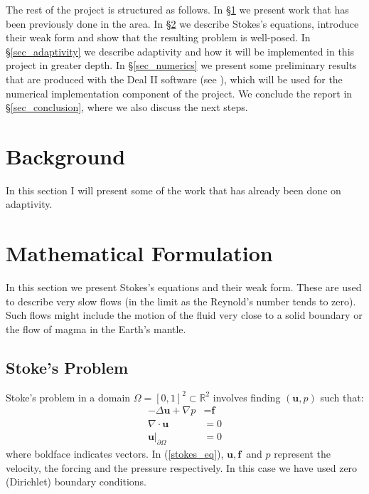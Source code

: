 \documentclass[12pt,a4paper]{article}
\theoremstyle{definition}
\begin{document}
The rest of the project is structured as follows.  In \S \ref{sec_back} we present work that has been previously done in the area.  In \S \ref{sec_mathform} we describe Stokes's equations, introduce their weak form and show that the resulting problem is well-posed.  In \S \ref{sec_adaptivity} we  describe adaptivity and how it will be implemented in this project in greater depth.  In \S \ref{sec_numerics} we present some preliminary results that are produced with the Deal II software (see \cite{BangerthHartmannKanschat2007}), which  will be used for the numerical implementation component of the project.  We conclude the report in \S \ref{sec_conclusion}, where we also discuss the next steps.

\section{Background}\label{sec_back}
In this section I will present some of the work that has already been done on adaptivity.

\section{Mathematical Formulation}\label{sec_mathform}
In this section we present Stokes's equations and their weak form.   These are used to describe very slow flows (in the limit as the Reynold's number tends to zero).  Such flows might include the motion of the fluid very close to a solid boundary or the flow of magma in the Earth's mantle.  
\subsection{Stoke's Problem}
Stoke's problem in a domain $\Omega = \left[0,1\right]^2 \subset \mathbb{R}^2$ involves finding $\left(\textbf{u},p\right)$ such that:
\begin{equation}\label{stokes_eq}
\begin{aligned}
	-\Delta\textbf{u} + \nabla p &= \textbf{f} \\ 
	\nabla\cdot \textbf{u}&= 0\\ 
\textbf{u}|_{\partial\Omega}&=0 
\end{aligned}
\end{equation}
where boldface indicates vectors.  In (\ref{stokes_eq}), $\textbf{u},\, \textbf{f}$ and $p$ represent the velocity, the forcing and the pressure respectively.  In this case we have used zero (Dirichlet) boundary conditions. 
\end{document}
